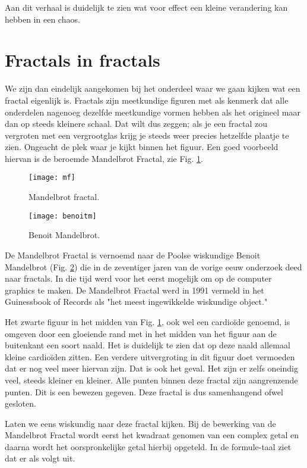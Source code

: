 \documentclass[11pt,fleqn]{book} %
\begin{document}
Aan dit verhaal is duidelijk te zien wat voor effect een kleine verandering kan hebben in een chaos.

\section{Fractals in fractals}
We zijn dan eindelijk aangekomen bij het onderdeel waar we gaan kijken wat een fractal eigenlijk is.
Fractals zijn meetkundige figuren met als kenmerk dat alle onderdelen nagenoeg dezelfde meetkundige vormen hebben als het origineel maar dan op steeds kleinere schaal. Dat wilt dus zeggen; als je een fractal zou vergroten met een vergrootglas krijg je steeds weer precies hetzelfde plaatje te zien. Ongeacht de plek waar je kijkt binnen het figuur. Een goed voorbeeld hiervan is de beroemde Mandelbrot Fractal, zie Fig. \ref{fig:mf}\cite{mandelbrot}.
\begin{figure}[h]
	\centering\texttt{[image: mf]}
	\caption{Mandelbrot fractal.}
	\label{fig:mf}
\end{figure}
\begin{figure}[h]
	\centering\texttt{[image: benoitm]}
	\caption{Benoit Mandelbrot.}
	\label{fig:benoitm}
\end{figure}
De Mandelbrot Fractal is vernoemd naar de Poolse wiskundige Benoit Mandelbrot (Fig. \ref{fig:benoitm}) die in de zeventiger jaren van de vorige eeuw onderzoek deed naar fractals. In die tijd werd voor het eerst mogelijk om op de computer graphics te maken. De Mandelbrot Fractal werd in 1991 vermeld in het Guinessbook of Records als "het meest ingewikkelde wiskundige object."

Het zwarte figuur in het midden van Fig. \ref{fig:mf}, ook wel een cardioïde genoemd, is omgeven door een gloeiende rand met in het midden van het figuur aan de buitenkant een soort naald. Het is duidelijk te zien dat op deze naald allemaal kleine cardioïden zitten. Een verdere uitvergroting in dit figuur doet vermoeden dat er nog veel meer hiervan zijn. Dat is ook het geval. Het zijn er zelfs oneindig veel, steeds kleiner en kleiner. Alle punten binnen deze fractal zijn aangrenzende punten. Dit is een bewezen gegeven. Deze fractal is dus samenhangend ofwel gesloten.

Laten we eens wiskundig naar deze fractal kijken. Bij de bewerking van de Mandelbrot Fractal wordt eerst het kwadraat genomen van een complex getal en daarna wordt het oorspronkelijke getal hierbij opgeteld. In de formule-taal ziet dat er als volgt uit.
\end{document}
